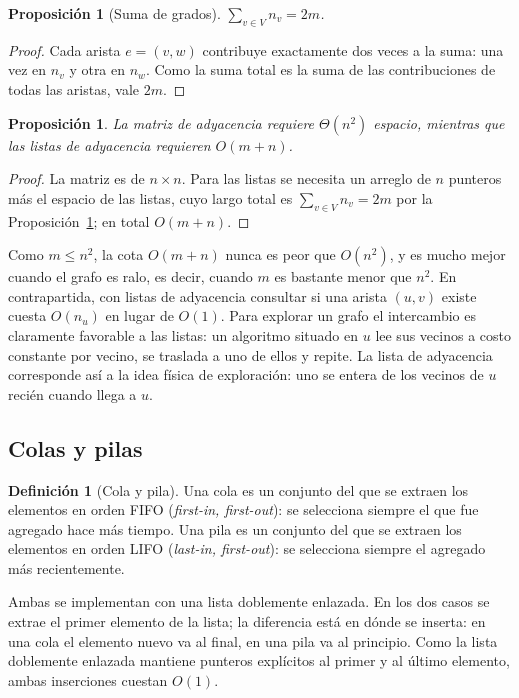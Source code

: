 \documentclass[12pt, spanish, oneside, openany]{book}
\theoremstyle{uprightplain}
\newtheorem{proposicion}[teorema]{Proposición}
\theoremstyle{definition}
\newtheorem{definicion}[teorema]{Definición}
\theoremstyle{remark}
\theoremstyle{definition}
\begin{document}
\begin{proposicion}[Suma de grados]
\label{prop:suma-grados}
$\displaystyle \sum_{v\in V} n_v = 2m$.
\end{proposicion}
\begin{proof}
Cada arista $e=(v,w)$ contribuye exactamente dos veces a la suma: una vez en $n_v$ y otra en $n_w$. Como la suma total es la suma de las contribuciones de todas las aristas, vale $2m$.
\end{proof}

\begin{proposicion}
\label{prop:espacio}
La matriz de adyacencia requiere $\Theta(n^2)$ espacio, mientras que las listas de adyacencia requieren $O(m+n)$.
\end{proposicion}
\begin{proof}
La matriz es de $n\times n$. Para las listas se necesita un arreglo de $n$ punteros más el espacio de las listas, cuyo largo total es $\sum_{v\in V} n_v = 2m$ por la Proposición~\ref{prop:suma-grados}; en total $O(m+n)$.
\end{proof}

Como $m\le n^2$, la cota $O(m+n)$ nunca es peor que $O(n^2)$, y es mucho mejor cuando el grafo es ralo, es decir, cuando $m$ es bastante menor que $n^2$. En contrapartida, con listas de adyacencia consultar si una arista $(u,v)$ existe cuesta $O(n_u)$ en lugar de $O(1)$. Para explorar un grafo el intercambio es claramente favorable a las listas: un algoritmo situado en $u$ lee sus vecinos a costo constante por vecino, se traslada a uno de ellos y repite. La lista de adyacencia corresponde así a la idea física de exploración: uno se entera de los vecinos de $u$ recién cuando llega a $u$.

\subsection{Colas y pilas}

\begin{definicion}[Cola y pila]
\label{def:cola-pila}
Una cola es un conjunto del que se extraen los elementos en orden FIFO (\emph{first-in, first-out}): se selecciona siempre el que fue agregado hace más tiempo. Una pila es un conjunto del que se extraen los elementos en orden LIFO (\emph{last-in, first-out}): se selecciona siempre el agregado más recientemente.
\end{definicion}

Ambas se implementan con una lista doblemente enlazada. En los dos casos se extrae el primer elemento de la lista; la diferencia está en dónde se inserta: en una cola el elemento nuevo va al final, en una pila va al principio. Como la lista doblemente enlazada mantiene punteros explícitos al primer y al último elemento, ambas inserciones cuestan $O(1)$.
\end{document}
